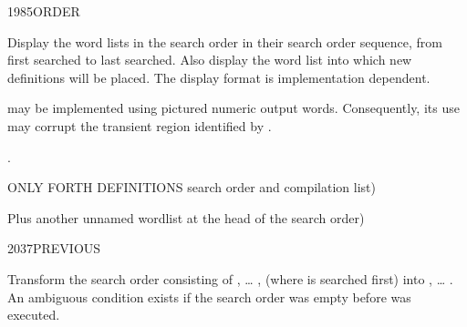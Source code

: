 \begin{worddef}{1985}{ORDER}
\item \stack{}{}

	Display the word lists in the search order in their search order
	sequence, from first searched to last searched. Also display the
	word list into which new definitions will be placed. The display
	format is implementation dependent.

	 may be implemented using pictured numeric output
	words. Consequently, its use may corrupt the transient region
	identified by .

\see {}.

	\begin{testing}\ttfamily
	\cbstart{}
		  ONLY FORTH DEFINITIONS search order and compilation list)  \\

		  Plus another unnamed wordlist at the head of the search order)  \\
	\cbend
	\end{testing}
\end{worddef}


\begin{worddef}{2037}{PREVIOUS}
\item \stack{}{}

	Transform the search order consisting of , {\ldots}
	,  (where  is searched
	first) into , {\ldots} . An ambiguous
	condition exists if the search order was empty before
	 was executed.
\end{worddef}
